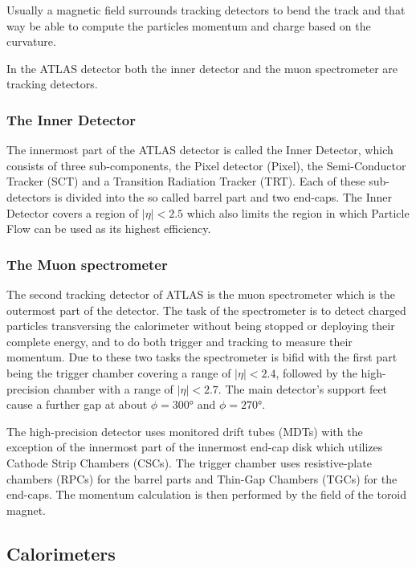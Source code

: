 Usually a magnetic field surrounds tracking detectors to bend the track and that way be able to compute the particles momentum and charge based on the curvature.


In the ATLAS detector both the inner detector and the muon spectrometer are tracking detectors.

\subsubsection{The Inner Detector}

The innermost part of the ATLAS detector is called the Inner Detector, which consists of three sub-components, the Pixel detector (Pixel), the Semi-Conductor Tracker (SCT) and a Transition Radiation Tracker (TRT). Each of these sub-detectors is divided into the so called barrel part and two end-caps. The Inner Detector covers a region of $|\eta| < \num{2.5}$ which also limits the region in which Particle Flow can be used as its highest efficiency.

\subsubsection{The Muon spectrometer}

The second tracking detector of ATLAS is the muon spectrometer which is the outermost part of the detector. The task of the spectrometer is to detect charged particles transversing the calorimeter without being stopped or deploying their complete energy, and to do both trigger and tracking to measure their momentum. Due to these two tasks the spectrometer is bifid with the first part being the trigger chamber covering a range of $|\eta|<2.4$, followed by the high-precision chamber with a range of $|\eta|<2.7$. The main detector's support feet cause a further gap at about $\phi = \ang{300}$ and $\phi = \ang{270}$. 

The high-precision detector uses monitored drift tubes (MDTs) with the exception of the innermost part of the innermost end-cap disk which utilizes Cathode Strip Chambers (CSCs). The trigger chamber uses resistive-plate chambers (RPCs) for the barrel parts and Thin-Gap Chambers (TGCs) for the end-caps. The momentum calculation is then performed by the field of the toroid magnet.



\subsection{Calorimeters}

